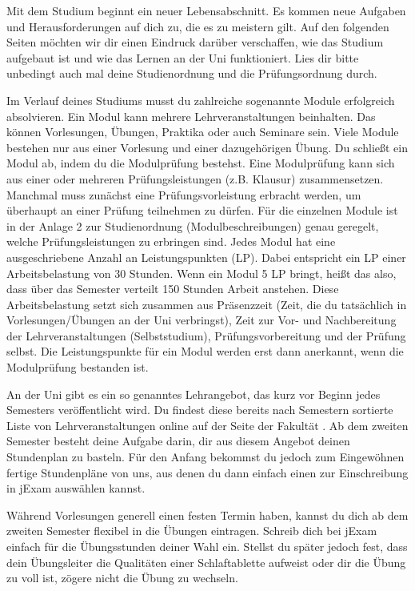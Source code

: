 
Mit dem Studium beginnt ein neuer Lebensabschnitt. Es kommen neue Aufgaben und Herausforderungen auf dich zu, die es zu meistern gilt. Auf den folgenden Seiten möchten
wir dir einen Eindruck darüber verschaffen, wie das Studium aufgebaut ist und wie das Lernen an der Uni funktioniert. Lies dir bitte unbedingt auch mal deine Studienordnung
und die Prüfungsordnung durch.

Im Verlauf deines Studiums musst du zahlreiche sogenannte Module erfolgreich absolvieren. Ein Modul kann mehrere Lehrveranstaltungen beinhalten. Das können Vorlesungen,
Übungen, Praktika oder auch Seminare sein. Viele Module bestehen nur aus einer Vorlesung und einer dazugehörigen Übung. Du schließt ein Modul ab, indem du die Modulprüfung
bestehst. Eine Modulprüfung kann sich aus einer oder mehreren Prüfungsleistungen (z.B. Klausur) zusammensetzen. Manchmal muss zunächst eine Prüfungsvorleistung erbracht werden, um
überhaupt an einer Prüfung teilnehmen zu dürfen. Für die einzelnen Module ist in der Anlage 2 zur Studienordnung (Modulbeschreibungen) genau geregelt, welche Prüfungsleistungen zu
erbringen sind.
Jedes Modul hat eine ausgeschriebene Anzahl an Leistungspunkten (LP). Dabei entspricht ein LP einer Arbeitsbelastung von 30 Stunden. Wenn ein Modul 5 LP bringt, heißt das also,
dass über das Semester verteilt 150 Stunden Arbeit anstehen. Diese Arbeitsbelastung setzt sich zusammen aus Präsenzzeit (Zeit, die du tatsächlich in Vorlesungen/Übungen an der Uni verbringst),
Zeit zur Vor- und Nachbereitung der Lehrveranstaltungen (Selbststudium), Prüfungsvorbereitung und der Prüfung selbst. Die Leistungspunkte für ein Modul werden erst dann anerkannt, wenn
die Modulprüfung bestanden ist.


An der Uni gibt es ein so genanntes Lehrangebot, das kurz vor Beginn jedes Semesters veröffentlicht wird.
Du findest diese bereits nach Semestern sortierte Liste von Lehrveranstaltungen online auf der Seite der Fakultät .
Ab dem zweiten Semester besteht deine Aufgabe darin, dir aus diesem Angebot deinen Stundenplan zu basteln.
Für den Anfang bekommst du jedoch zum Eingewöhnen fertige Stundenpläne von uns, aus denen du dann einfach einen zur Einschreibung in jExam auswählen kannst.

Während Vorlesungen generell einen festen Termin haben, kannst du dich ab dem zweiten Semester flexibel in die Übungen eintragen.
Schreib dich bei jExam  einfach für die Übungsstunden deiner Wahl ein.
Stellst du später jedoch fest, dass dein Übungsleiter die Qualitäten einer Schlaftablette aufweist oder dir die Übung zu voll ist, zögere nicht die Übung zu wechseln.

